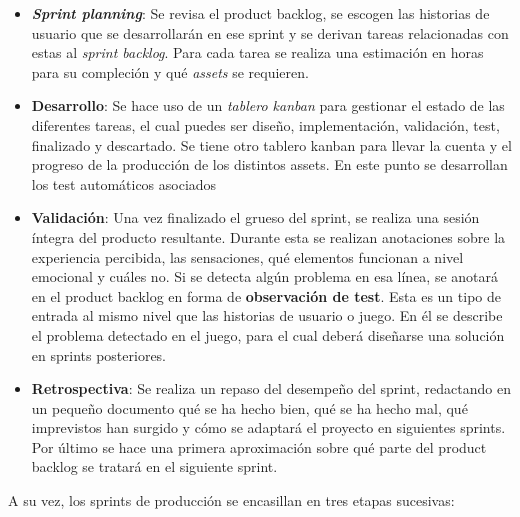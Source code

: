 \begin{itemize}
    \item \textbf{\textit{Sprint planning}}: Se revisa el product backlog, se escogen las historias de usuario que se desarrollarán en ese sprint y se derivan tareas relacionadas con estas al \textit{sprint backlog}. Para cada tarea se realiza una estimación en horas para su compleción y qué \textit{assets} se requieren.
    \item \textbf{Desarrollo}: Se hace uso de un \textit{tablero kanban} para gestionar el estado de las diferentes tareas, el cual puedes ser diseño, implementación, validación, test, finalizado y descartado. Se tiene otro tablero kanban para llevar la cuenta y el progreso de la producción de los distintos assets. En este punto se desarrollan los test automáticos asociados 
    \item \textbf{Validación}: Una vez finalizado el grueso del sprint, se realiza una sesión íntegra del producto resultante. Durante esta se realizan anotaciones sobre la experiencia percibida, las sensaciones, qué elementos funcionan a nivel emocional y cuáles no. Si se detecta algún problema en esa línea, se anotará en el product backlog en forma de \textbf{observación de test}. Esta es un tipo de entrada al mismo nivel que las historias de usuario o juego. En él se describe el problema detectado en el juego, para el cual deberá diseñarse una solución en sprints posteriores.
    \item \textbf{Retrospectiva}: Se realiza un repaso del desempeño del sprint, redactando en un pequeño documento qué se ha hecho bien, qué se ha hecho mal, qué imprevistos han surgido y cómo se adaptará el proyecto en siguientes sprints. Por último se hace una primera aproximación sobre qué parte del product backlog se tratará en el siguiente sprint.
\end{itemize}

A su vez, los sprints de producción se encasillan en tres etapas sucesivas:

